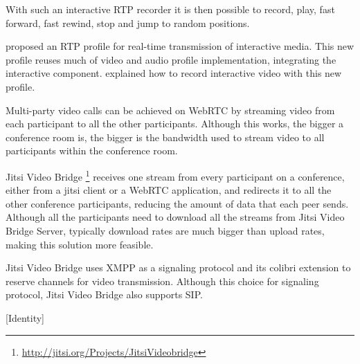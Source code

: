 	With such an interactive \ac{RTP} recorder it is then possible to record, play, fast forward, fast rewind, stop and jump to random positions.

  \cite{interactive_stream} proposed an \ac{RTP} profile for real-time transmission of interactive media. This new profile reuses much of video and audio profile implementation, integrating the interactive component.   \cite{interactive_record} explained how to record interactive video with this new profile.

	
	Multi-party video calls can be achieved on \ac{WebRTC} by streaming video from each participant to all the other participants. Although this works, the bigger a conference room is, the bigger is the bandwidth used to stream video to all participants within the conference room.

	Jitsi Video Bridge \footnote{\url{http://jitsi.org/Projects/JitsiVideobridge}} receives one stream from every participant on a conference, either from a jitsi client or a \ac{WebRTC} application, and redirects it to all the other conference participants, reducing the amount of data that each peer sends. Although all the participants need to download all the streams from Jitsi Video Bridge Server, typically download rates are much bigger than upload rates, making this solution more feasible.

	Jitsi Video Bridge uses \ac{XMPP} as a signaling protocol and its colibri extension \cite{xep0340} to reserve channels for video transmission. Although this choice for signaling protocol, Jitsi Video Bridge also supports \ac{SIP}.


  {\color{red}[Identity]}



